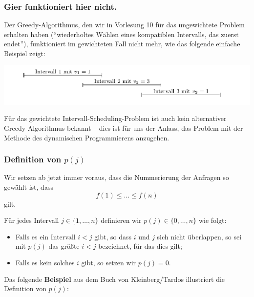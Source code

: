 \documentclass[smaller]{beamer}
\begin{document}
\begin{frame}
 \frametitle{Gier funktioniert hier nicht.}
 Der Greedy-Algorithmus, den wir in Vorlesung 10 für das ungewichtete Problem erhalten haben (\enquote{wiederholtes Wählen eines kompatiblen Intervalls, das zuerst endet}), funktioniert im gewichteten Fall nicht mehr, wie das folgende einfache Beispiel zeigt:

\begin{center}
 \includegraphics{fig87.pdf}
\end{center}

Für das gewichtete Intervall-Scheduling-Problem ist auch kein alternativer Greedy-Algorithmus bekannt -- dies ist für uns der Anlass, das Problem mit der Methode des dynamischen Programmierens anzugehen.
\end{frame}

\begin{frame}
\frametitle{Definition von $p(j)$}
\alert{Wir setzen ab jetzt immer voraus, dass die Nummerierung der Anfragen so gewählt ist, dass
\[
  f(1) \leq \ldots \leq f(n)
\]
gilt.} \\ \medskip

Für jedes Intervall $j \in \{ 1,\ldots,n \}$ definieren wir $p(j) \in \{ 0, \ldots,n \}$ wie folgt:
\begin{itemize}
\item Falls es ein Intervall $i<j$ gibt, so dass $i$ und $j$ sich nicht überlappen, so sei mit $p(j)$ das größte $i<j$ bezeichnet, für das dies gilt;
\item Falls es kein solches $i$ gibt, so setzen wir $p(j)=0$.
\end{itemize} \medskip

Das folgende \textbf{Beispiel} aus dem Buch von Kleinberg/Tardos illustriert die Definition von $p(j)$:
\end{frame}
\end{document}
